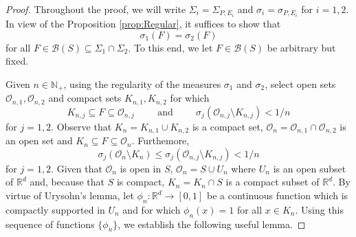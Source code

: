 \documentclass[11pt]{article}
\theoremstyle{remark}
\begin{document}
\begin{proof}
Throughout the proof, we will write $\Sigma_i=\Sigma_{P,E_i}$ and $\sigma_i=\sigma_{P,E_i}$ for $i=1,2$. In view of the Proposition \ref{prop:Regular}, it suffices to show that 
\begin{equation*}
\sigma_1(F)=\sigma_2(F)
\end{equation*}
for all $F\in \mathcal{B}(S)\subseteq \Sigma_{1}\cap\Sigma_{2}$. To this end, we let $F\in\mathcal{B}(S)$ be arbitrary but fixed. 

Given $n\in\mathbb{N}_+$, using the regularity of the measures $\sigma_1$ and $\sigma_2$, select open sets $\mathcal{O}_{n,1},\mathcal{O}_{n,2}$ and compact sets $K_{n,1},K_{n,2}$ for which
\begin{equation*}
K_{n,j}\subseteq F\subseteq \mathcal{O}_{n,j}\hspace{1cm}\mbox{and}\hspace{1cm}\sigma_j(\mathcal{O}_{n,j}\setminus K_{n,j})<1/n
\end{equation*}
for $j=1,2$. Observe that $K_n=K_{n,1}\cup K_{n,2}$ is a compact set, $\mathcal{O}_n=\mathcal{O}_{n,1}\cap\mathcal{O}_{n,2}$ is an open set and $K_n\subseteq F\subseteq \mathcal{O}_n$. Furthemore, 
\begin{equation*}
\sigma_j(\mathcal{O}_n\setminus K_n)\leq \sigma_j(\mathcal{O}_{n,j}\setminus K_{n,j})<1/n
\end{equation*}
for $j=1,2$. Given that $\mathcal{O}_n$ is open in $S$, $\mathcal{O}_n=S\cup U_n$ where $U_n$ is an open subset of $\mathbb{R}^d$ and, because that $S$ is compact, $K_n=K_n\cap S$ is a compact subset of $\mathbb{R}^d$. By virtue of Urysohn's lemma, let $\phi_n:\mathbb{R}^d\to [0,1]$ be a continuous function which is compactly supported in $U_n$ and for which $\phi_n(x)=1$ for all $x\in K_n$. Using this sequence of functions $\{\phi_n\}$, we establish the following useful lemma.


\end{proof}
\end{document}
